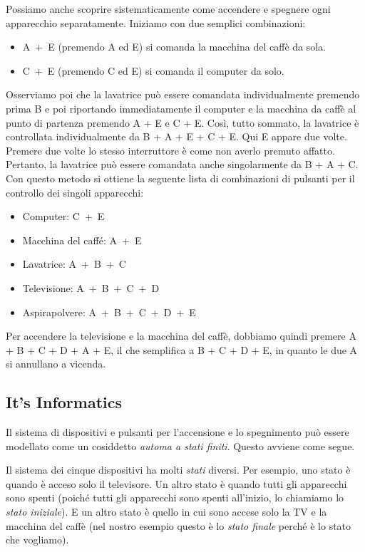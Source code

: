 \documentclass[a4paper,11pt]{report}
\begin{document}
Possiamo anche scoprire sistematicamente come accendere e spegnere ogni apparecchio separatamente. Iniziamo con due semplici combinazioni:

\begin{itemize}
  \item A~+~E (premendo A ed E) si comanda la macchina del caffè da sola.
  \item C~+~E (premendo C ed E) si comanda il computer da solo.
\end{itemize}

Osserviamo poi che la lavatrice può essere comandata individualmente premendo prima B e poi riportando immediatamente il computer e la macchina da caffè al punto di partenza premendo A + E e C + E. Così, tutto sommato, la lavatrice è controllata individualmente da B + A + E + C + E. Qui E appare due volte. Premere due volte lo stesso interruttore è come non averlo premuto affatto. Pertanto, la lavatrice può essere comandata anche singolarmente da B + A + C. Con questo metodo si ottiene la seguente lista di combinazioni di pulsanti per il controllo dei singoli apparecchi:

\begin{itemize}
  \item Computer: C~+~E
  \item Macchina del caffé: A~+~E
  \item Lavatrice: A~+~B~+~C
  \item Televisione: A~+~B~+~C~+~D
  \item Aspirapolvere: A~+~B~+~C~+~D~+~E
\end{itemize}

Per accendere la televisione e la macchina del caffè, dobbiamo quindi premere A + B + C + D + A + E, il che semplifica a B + C + D + E, in quanto le due A si annullano a vicenda.


\subsection*{It’s Informatics}

Il sistema di dispositivi e pulsanti per l’accensione e lo spegnimento può essere modellato come un cosiddetto \emph{automa a stati finiti}. Questo avviene come segue.

Il sistema dei cinque dispositivi ha molti \emph{stati} diversi. Per esempio, uno stato è quando è acceso solo il televisore. Un altro stato è quando tutti gli apparecchi sono spenti (poiché tutti gli apparecchi sono spenti all’inizio, lo chiamiamo lo \emph{stato iniziale}). E un altro stato è quello in cui sono accese solo la TV e la macchina del caffè (nel nostro esempio questo è lo \emph{stato finale} perché è lo stato che vogliamo).
\end{document}

